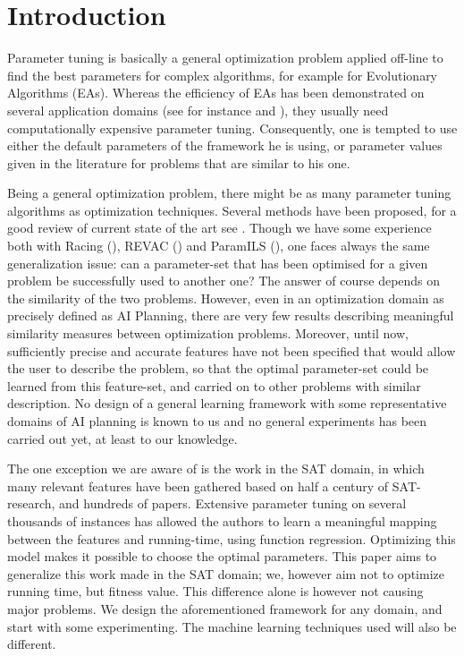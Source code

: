 \documentclass{acm_proc_article-sp}
\begin{document}


\section{Introduction}

Parameter tuning is basically a general optimization problem applied off-line to find the best parameters for complex algorithms, for example for Evolutionary Algorithms (EAs). Whereas the efficiency of EAs has been demonstrated on several application domains (see for instance \cite{practice08} and \cite{ParameterSettingBook07}), they usually need computationally expensive parameter tuning. Consequently, one is tempted to use either the default parameters of the framework he is using, or parameter values given in the literature for problems that are similar to his one. 

Being a general optimization problem, there might be as many parameter tuning algorithms as optimization techniques. Several methods have been proposed, for a good review of current state of the art see \cite{Montero:2010}. Though we have some experience both with Racing (\cite{bibai:2009}), REVAC (\cite{Nannen07}) and ParamILS (\cite{ParamILS-JAIR}), one faces always the same generalization issue: can a parameter-set that has been optimised for a given problem be successfully used to another one? The answer of course depends on the similarity of the two problems. However, even in an optimization domain as precisely defined as AI Planning, there are very few results describing meaningful similarity measures between optimization problems. Moreover, until now, sufficiently precise and accurate features have not been specified that would allow the user to describe the problem, so that the optimal parameter-set could be learned from this feature-set, and carried on to other problems with similar description. No design of a general learning framework with some representative domains of AI planning is known to us and no general experiments has been carried out yet, at least to our knowledge.

The one exception we are aware of is the work \cite{Hutter06} in the SAT domain, in which many relevant features have been gathered based on half a century of SAT-research, and hundreds of papers. Extensive parameter tuning on several thousands of instances has allowed the authors to learn a meaningful mapping between the features and running-time, using function regression. Optimizing this model makes it possible to choose the optimal parameters. This paper aims to generalize this work made in the SAT domain; we, however aim not to optimize running time, but fitness value. This difference alone is however not causing major problems. We design the aforementioned framework for any domain, and start with some experimenting. The machine learning techniques used will also be different.
\end{document}

